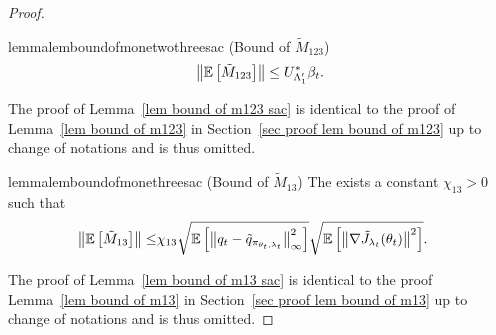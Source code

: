 \documentclass[twoside,11pt]{article}
\newcommand{\E}{\mathbb{E}}
\numberwithin{assucounter}{section}
\begin{document}
\begin{proof}
\begin{restatable}{lemma}{lemboundofmonetwothreesac}
  \label{lem bound of m123 sac}
  (Bound of $\tilde M_{123}$)
  \begin{align}
    \norm{\E\left[\tilde M_{123}\right]} \leq U_{\Lambda_1'}^* \beta_t.
  \end{align}
\end{restatable}
\noindent
The proof of Lemma~\ref{lem bound of m123 sac} is identical to the proof of Lemma~\ref{lem bound of m123} in Section~\ref{sec proof lem bound of m123} up to change of notations and is thus omitted.

\begin{restatable}{lemma}{lemboundofmonethreesac}
  \label{lem bound of m13 sac}
  (Bound of $\tilde M_{13}$)
  The exists a constant $\chi_{13} > 0$ such that
  \begin{align}
    \norm{\E\left[\tilde M_{13}\right]}\leq& \chi_{13} \sqrt{\E\left[\norm{q_t - \tilde q_{\pi_{\theta_t, \lambda_t}}}_\infty^2 \right]} \sqrt{\E\left[\norm{\nabla \tilde J_{\lambda_t}(\theta_t)}^2\right]}.
  \end{align}
\end{restatable}
\noindent
The proof of Lemma~\ref{lem bound of m13 sac} is identical to the proof Lemma~\ref{lem bound of m13} in Section~\ref{sec proof lem bound of m13} 
up to change of notations and is thus omitted.


\end{proof}
\end{document}
